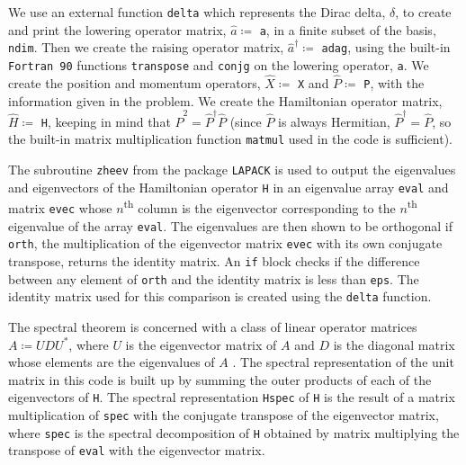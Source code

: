 \documentclass[12pt]{article}
\begin{document}
We use an external function {\tt delta} which represents the Dirac delta, $\delta$, to create and print the lowering operator matrix, $\hat{a}\coloneqq$ {\tt a}, in a finite subset of the basis, {\tt ndim}.  Then we create the raising operator matrix, $\hat{a}^\dagger\coloneqq$ {\tt adag}, using the built-in {\tt Fortran 90} functions {\tt transpose} and {\tt conjg} on the lowering operator, {\tt a}.  We create the position and momentum operators, $\hat{X}\coloneqq$ {\tt X} and $\hat{P}\coloneqq$ {\tt P}, with the information given in the problem.  We create the Hamiltonian operator matrix, $\hat{H}\coloneqq$ {\tt H}, keeping in mind that $\hat{P}^2=\hat{P}^\dagger\hat{P}$ (since $\hat{P}$ is always Hermitian, $\hat{P}^\dagger=\hat{P}$, so the built-in matrix multiplication function {\tt matmul} used in the code is sufficient).  

The subroutine {\tt zheev} from the package {\tt LAPACK} is used to output the eigenvalues and eigenvectors of the Hamiltonian operator {\tt H} in an eigenvalue array {\tt eval} and matrix {\tt evec} whose $n$\textsuperscript{th} column is the eigenvector corresponding to the $n$\textsuperscript{th} eigenvalue of the array {\tt eval}.  The eigenvalues are then shown to be orthogonal if {\tt orth}, the multiplication of the eigenvector matrix {\tt evec} with its own conjugate transpose, returns the identity matrix.  An {\tt if} block checks if the difference between any element of {\tt orth} and the identity matrix is less than {\tt eps}.  The identity matrix used for this comparison is created using the {\tt delta} function.  

The spectral theorem is concerned with a class of linear operator matrices  $A\coloneqq UDU^*$, where $U$ is the eigenvector matrix of $A$ and $D$ is the diagonal matrix whose elements are the eigenvalues of $A$ \cite{wikispec}.  The spectral representation of the unit matrix in this code is built up by summing the outer products of each of the eigenvectors of {\tt H}.  The spectral representation {\tt Hspec} of {\tt H} is the result of a matrix multiplication of {\tt spec} with the conjugate transpose of the eigenvector matrix, where {\tt spec} is the spectral decomposition of {\tt H} obtained by matrix multiplying the transpose of {\tt eval} with the eigenvector matrix.
\end{document}

